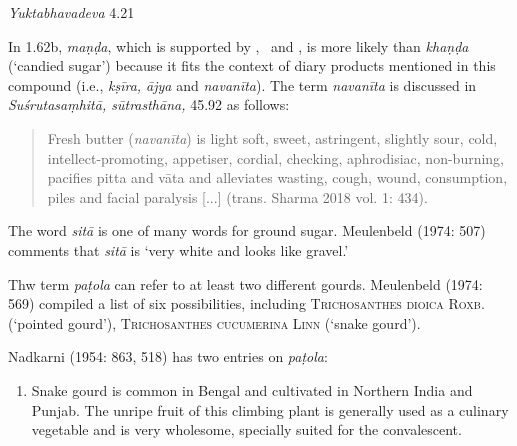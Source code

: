 \begin{ekdosis}
\begin{testimonia}[hp01_062]
\emph{Yuktabhavadeva} 4.21

\begin{versinnote}
\end{versinnote}

\end{testimonia}

\begin{philcomm}[hp01_062]
In 1.62b, \emph{maṇḍa}, which is supported by \textalpha, \textbeta\ and \textgamma, is more likely than \emph{khaṇḍa} (`candied sugar') because it fits the context of diary products mentioned in this compound (i.e., \emph{kṣīra, ājya} and \emph{navanīta}). The term \emph{navanīta} is discussed in \emph{Suśrutasaṃhitā, sūtrasthāna,} 45.92 as follows:
\begin{quote}
Fresh butter (\emph{navanīta}) is light soft, sweet, astringent, slightly sour, cold, intellect-promoting, appetiser, cordial, checking, aphrodisiac, non-burning, pacifies pitta and vāta and alleviates wasting, cough, wound, consumption, piles and facial paralysis [...] (trans. Sharma 2018 vol. 1: 434).    
\end{quote}

The word \emph{sitā} is one of many words for ground sugar. Meulenbeld (1974: 507) comments that \emph{sitā} is `very white and looks like gravel.'

Thw term \emph{paṭola} can refer to at least two different gourds. Meulenbeld (1974: 569) compiled a list of six possibilities, including \textsc{Trichosanthes dioica} \textsc{Roxb}. (`pointed gourd'), \textsc{Trichosanthes cucumerina} \textsc{Linn} (`snake gourd').

Nadkarni (1954: 863, 518) has two entries on \emph{paṭola}:
\begin{enumerate}
\item Snake gourd is common in Bengal and cultivated in Northern India and Punjab. The unripe fruit of this climbing plant is generally used as a culinary vegetable and is very wholesome, specially suited for the convalescent.


\end{enumerate}
\end{philcomm}
\end{ekdosis}
